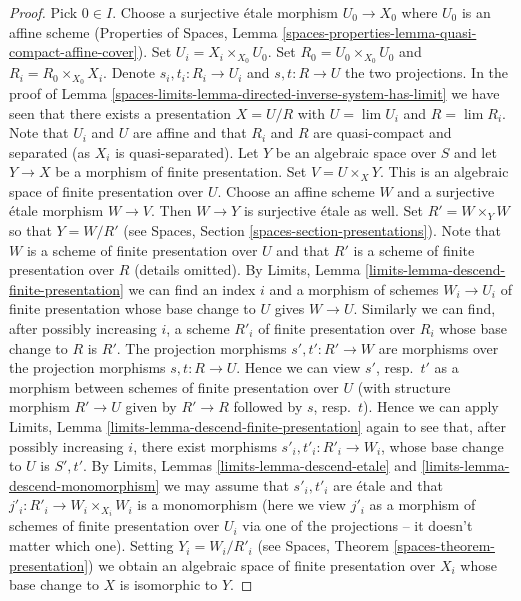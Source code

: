\begin{proof}
Pick $0 \in I$. Choose a surjective \'etale morphism $U_0 \to X_0$ where
$U_0$ is an affine scheme (Properties of Spaces, Lemma
\ref{spaces-properties-lemma-quasi-compact-affine-cover}).
Set $U_i = X_i \times_{X_0} U_0$. Set $R_0 = U_0 \times_{X_0} U_0$ and
$R_i = R_0 \times_{X_0} X_i$. Denote $s_i, t_i : R_i \to U_i$ and
$s, t : R \to U$ the two projections. In the proof of
Lemma \ref{spaces-limits-lemma-directed-inverse-system-has-limit} we have
seen that there exists a presentation $X = U/R$ with
$U = \lim U_i$ and $R = \lim R_i$. Note that $U_i$ and $U$ are affine and
that $R_i$ and $R$ are quasi-compact and separated (as $X_i$ is
quasi-separated). Let $Y$ be an algebraic space over $S$ and let
$Y \to X$ be a morphism of finite presentation. Set $V = U \times_X Y$.
This is an algebraic space of finite presentation over $U$.
Choose an affine scheme $W$ and a surjective \'etale morphism $W \to V$.
Then $W \to Y$ is surjective \'etale as well. Set $R' = W \times_Y W$
so that $Y = W/R'$ (see Spaces, Section \ref{spaces-section-presentations}).
Note that $W$ is a scheme of finite presentation over $U$ and that $R'$
is a scheme of finite presentation over $R$ (details omitted).
By Limits, Lemma \ref{limits-lemma-descend-finite-presentation}
we can find an index $i$ and a morphism of schemes $W_i \to U_i$ of
finite presentation whose base change to $U$ gives $W \to U$. Similarly
we can find, after possibly increasing $i$, a scheme $R'_i$ of finite
presentation over $R_i$ whose base change to $R$ is $R'$.
The projection morphisms $s', t' : R' \to W$ are morphisms over
the projection morphisms $s, t : R \to U$. Hence we can view $s'$,
resp.\ $t'$ as a morphism between schemes of finite presentation over
$U$ (with structure morphism $R' \to U$ given by $R' \to R$ followed
by $s$, resp.\ $t$). Hence we can apply
Limits, Lemma \ref{limits-lemma-descend-finite-presentation}
again to see that, after possibly increasing $i$, there exist
morphisms $s'_i, t'_i : R'_i \to W_i$, whose base change to $U$
is $S', t'$. By Limits, Lemmas \ref{limits-lemma-descend-etale} and
\ref{limits-lemma-descend-monomorphism}
we may assume that $s'_i, t'_i$ are \'etale and that
$j'_i : R'_i \to W_i \times_{X_i} W_i$ is a monomorphism (here we
view $j'_i$ as a morphism of schemes of finite presentation over $U_i$ via
one of the projections -- it doesn't matter which one). Setting
$Y_i = W_i/R'_i$ (see Spaces, Theorem \ref{spaces-theorem-presentation})
we obtain an algebraic space of finite presentation
over $X_i$ whose base change to $X$ is isomorphic to $Y$.


\end{proof}
